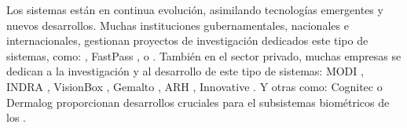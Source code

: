 

Los sistemas  están en continua evolución, asimilando tecnologías emergentes y nuevos desarrollos. Muchas instituciones gubernamentales, nacionales e internacionales, gestionan proyectos de investigación dedicados este tipo de sistemas, como:  \cite{ABC4EUOnline}, \Gls{FastPass} \cite{FastPassOnline}, \cite{berglund2008frontex} o \cite{kosmerlj2006face}. También en el sector privado, muchas empresas se dedican a la investigación y al desarrollo de este tipo de sistemas: \Gls{MODI} \cite{MODIOnline}, \Gls{INDRA} \cite{indraOnline}, \Gls{VisionBox} \cite{visionBoxOnline}, \Gls{Gemalto} \cite{gemaltoOnline}, \Gls{ARH} \cite{ARHOnline}, \Gls{Innovative} \cite{InnovativeOnline}. Y otras como: \Gls{Cognitec} \cite{cognitec2019url} o \Gls{Dermalog} \cite{DermalogOnline} proporcionan desarrollos cruciales para el subsistemas biométricos de los .     



